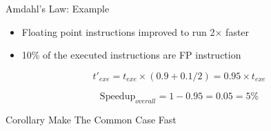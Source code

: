 \documentclass[aspectratio=169,12pt]{beamer}
\begin{document}
\begin{frame}{Amdahl's Law: Example}
\begin{itemize}
    \item Floating point instructions improved to run 2$\times$ faster
    \item 10\% of the executed instructions are FP instruction
\end{itemize}

\vspace{0.5cm}
$$t'_{exe} = t_{exe} \times (0.9 + 0.1 / 2) = 0.95 \times t_{exe}$$

$$\text{Speedup}_{overall} = 1 - 0.95 = 0.05 = 5\%$$

\vspace{1cm}
\begin{alertblock}{Corollary}
\centering
\Large Make The Common Case Fast
\end{alertblock}
\end{frame}
\end{document}

